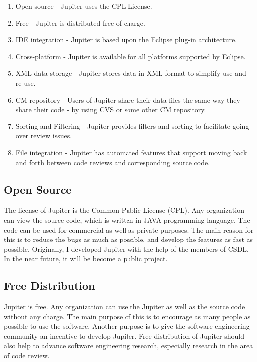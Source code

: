 \begin{enumerate}
	\item Open source - Jupiter uses the CPL License.
  \item Free - Jupiter is distributed free of charge.
  \item IDE integration - Jupiter is based upon the Eclipse plug-in architecture.
  \item Cross-platform - Jupiter is available for all platforms supported by Eclipse.
  \item XML data storage - Jupiter stores data in XML format to simplify use and re-use.
  \item CM repository - Users of Jupiter share their data files the same way they share their code - by using CVS or some other CM repository.
  \item Sorting and Filtering - Jupiter provides filters and sorting to facilitate going over review issues.
  \item File integration - Jupiter has automated features that support moving back and forth between code reviews and corresponding source code.
\end{enumerate}

\subsection{Open Source}
\label{subsec:open-source}

The license of Jupiter is the Common Public License (CPL). Any organization can view the source code, which is written in JAVA programming language. The code can be used for commercial as well as private purposes. The main reason for this is to reduce the bugs as much as possible, and develop the features as fast as possible. Originally, I developed Jupiter with the help of the members of CSDL. In the near future, it will be become a public project.

\subsection{Free Distribution}
\label{subsec:free-distribution}

Jupiter is free. Any organization can use the Jupiter as well as the source code without any charge. The main purpose of this is to encourage as many people as possible to use the software. Another purpose is to give the software engineering community an incentive to develop Jupiter. Free distribution of Jupiter should also help to advance software engineering research, especially research in the area of code review.


